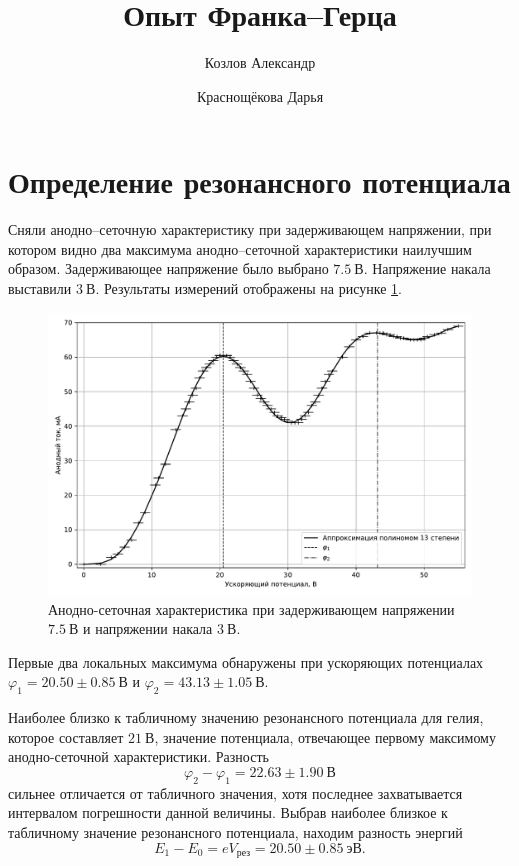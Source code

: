 \documentclass[12pt]{article}
\title{Опыт Франка\---Герца}
\author{Козлов Александр \and Краснощёкова Дарья}
\begin{document}
	\maketitle
	\section{Определение резонансного потенциала}
	Сняли анодно\---сеточную характеристику при задерживающем напряжении, при котором видно два максимума анодно\---сеточной характеристики наилучшим образом. Задерживающее напряжение было выбрано $7.5\ \text{В}$. Напряжение накала выставили $3\ \text{В}$. Результаты измерений отображены на рисунке \ref{fig:figure1}.
	\begin{figure}[htbp]
		\centering
		\includegraphics[width=\linewidth]{../plots/1}
		\caption{Анодно-сеточная характеристика при задерживающем напряжении $7.5\ \text{В}$ и напряжении накала $3\ \text{В}$.}
		\label{fig:figure1}
	\end{figure}
	Первые два локальных максимума обнаружены при ускоряющих потенциалах $\varphi_1 = 20.50\pm0.85\ \text{В}$ и $\varphi_2 = 43.13\pm1.05\ \text{В}$.
	\par Наиболее близко к табличному значению резонансного потенциала для гелия, которое составляет $21\ \text{В}$, значение потенциала, отвечающее первому максимому анодно-сеточной характеристики. Разность 
	\begin{equation}
		\varphi_2 - \varphi_1 = 22.63\pm1.90\ \text{В}
	\end{equation}
	сильнее отличается от табличного значения, хотя последнее захватывается интервалом погрешности данной величины. Выбрав наиболее близкое к табличному значение резонансного потенциала, находим разность энергий
	\begin{equation}
			E_1 - E_0 = eV_\text{рез} = 20.50\pm0.85\ \text{эВ}.
	\end{equation}
\end{document}
